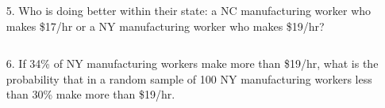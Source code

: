 \documentclass[12pt]{article}
\newcommand{\soln}[2]{$\:$\\ \vspace{#1}}{}
\begin{document}
\begin{enumerate}

\item[5.] Who is doing better within their state: a NC manufacturing worker who makes \$17/hr or a NY manufacturing 
worker who makes \$19/hr?

\soln{4cm}{
\begin{itemize}
\item Given: $X_{NY} \sim N(\mu = 18.39, \sigma = 1.5) \rightarrow X_{NY} = \$19 \rightarrow Z = \frac{19 - 18.39}{1.5} = 0.41$
\item Given: $X_{NC} \sim N(\mu = 15.85, \sigma = 1.11) \rightarrow X_{NC} = \$17 \rightarrow Z = 1.04$
\end{itemize}
NC manufacturing worker doing better since has a higher Z score.
}

\item[6.] If 34\% of NY manufacturing workers make more than \$19/hr, what is the probability that in a random sample of 100 NY manufacturing workers less than 30\% make more than \$19/hr.

\soln{2cm}{
$p = 0.34$, $n = 100$ \\
S/F: checks \\
$\mu = 0.34 \times 100 = 34$ and $\sigma = \sqrt{100 \times 0.34 \times 0.66} = 4.74$ \\
$P \left( K < 30 \right) = P \left( Z < \frac{30 - 34}{4.74} \right) = P(Z < -0.84) = 0.2$
}

\end{enumerate}
\end{document}
